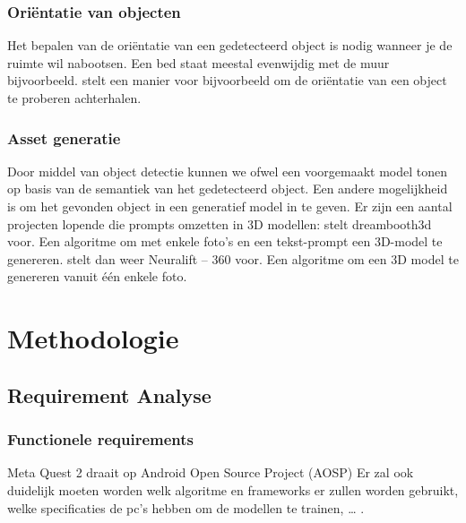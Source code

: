\documentclass{hogent-article}
\begin{document}
\subsubsection{Oriëntatie van objecten}

Het bepalen van de oriëntatie van een gedetecteerd object is nodig wanneer je de ruimte wil nabootsen. Een bed staat meestal evenwijdig met de muur bijvoorbeeld. \textcite{Saxena2009} stelt een manier voor bijvoorbeeld om de oriëntatie van een object te proberen achterhalen.

\subsubsection{Asset generatie}

Door middel van object detectie kunnen we ofwel een voorgemaakt model tonen op basis van de semantiek van het gedetecteerd object. Een andere mogelijkheid is om het gevonden object in een generatief model in te geven. Er zijn een aantal projecten lopende die prompts omzetten in 3D modellen: 
\textcite{Raj2023} stelt dreambooth3d voor. Een algoritme om met enkele foto’s en een tekst-prompt  een 3D-model te genereren.
\textcite{Xu2023} stelt dan weer Neuralift – 360 voor.  Een algoritme om een 3D model te genereren vanuit één enkele foto.


\section{Methodologie}%
\label{sec:methodologie}


\subsection{Requirement Analyse}



\subsubsection{Functionele requirements}

Meta Quest 2 draait op Android Open Source Project (AOSP)
Er zal ook duidelijk moeten worden welk algoritme en frameworks er zullen worden gebruikt, welke specificaties de pc’s hebben om de modellen te trainen, … .
\end{document}
